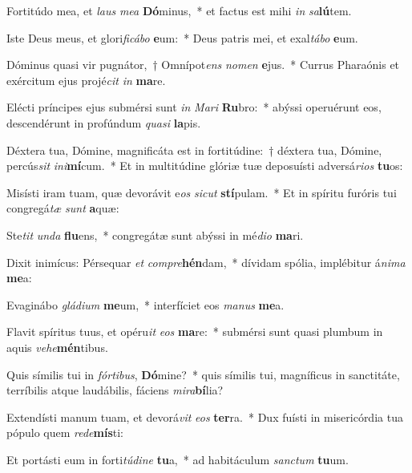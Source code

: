 \item Fortitúdo mea, et \textit{laus} \textit{me}\textit{a} \textbf{Dó}minus,~* et factus est mihi \textit{in} \textit{sa}\textbf{lú}tem.
\item Iste Deus meus, et glori\textit{fi}\textit{cá}\textit{bo} \textbf{e}um:~* Deus patris mei, et exal\textit{tá}\textit{bo} \textbf{e}um.
\item Dóminus quasi vir pugnátor,~† Omnípot\textit{ens} \textit{no}\textit{men} \textbf{e}jus.~* Currus Pharaónis et exércitum ejus projé\textit{cit} \textit{in} \textbf{ma}re.
\item Elécti príncipes ejus submérsi sunt \textit{in} \textit{Ma}\textit{ri} \textbf{Ru}bro:~* abýssi operuérunt eos, descendérunt in profúndum \textit{qua}\textit{si} \textbf{la}pis.
\item Déxtera tua, Dómine, magnificáta est in fortitúdine:~† déxtera tua, Dómine, percús\textit{sit} \textit{in}\textit{i}\textbf{mí}cum.~* Et in multitúdine glóriæ tuæ deposuísti adversá\textit{ri}\textit{os} \textbf{tu}os:
\item Misísti iram tuam, quæ devorávit e\textit{os} \textit{sic}\textit{ut} \textbf{stí}pulam.~* Et in spíritu furóris tui congregá\textit{tæ} \textit{sunt} \textbf{a}quæ:
\item Ste\textit{tit} \textit{un}\textit{da} \textbf{flu}ens,~* congregátæ sunt abýssi in mé\textit{di}\textit{o} \textbf{ma}ri.
\item Dixit inimícus: Pérsequar \textit{et} \textit{com}\textit{pre}\textbf{hén}dam,~* dívidam spólia, implébitur á\textit{ni}\textit{ma} \textbf{me}a:
\item Evaginábo \textit{glá}\textit{di}\textit{um} \textbf{me}um,~* interfíciet eos \textit{ma}\textit{nus} \textbf{me}a.
\item Flavit spíritus tuus, et opéru\textit{it} \textit{e}\textit{os} \textbf{ma}re:~* submérsi sunt quasi plumbum in aquis \textit{ve}\textit{he}\textbf{mén}tibus.
\item Quis símilis tui in \textit{fór}\textit{ti}\textit{bus}, \textbf{Dó}mine?~* quis símilis tui, magníficus in sanctitáte, terríbilis atque laudábilis, fáciens \textit{mi}\textit{ra}\textbf{bí}lia?
\item Extendísti manum tuam, et devorá\textit{vit} \textit{e}\textit{os} \textbf{ter}ra.~* Dux fuísti in misericórdia tua pópulo quem \textit{red}\textit{e}\textbf{mís}ti:
\item Et portásti eum in forti\textit{tú}\textit{di}\textit{ne} \textbf{tu}a,~* ad habitáculum \textit{sanc}\textit{tum} \textbf{tu}um.
